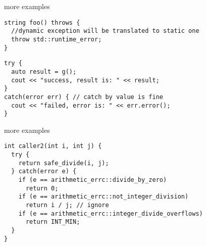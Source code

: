 \documentclass[10pt,a4paper]{beamer}
\begin{document}
\begin{frame}[fragile]{more examples}

	\begin{verbatim}
string foo() throws {
  //dynamic exception will be translated to static one
  throw std::runtime_error; 
}
	\end{verbatim}
	
	\hfill
	
	\begin{verbatim}
try {
  auto result = g();
  cout << "success, result is: " << result;
}
catch(error err) { // catch by value is fine
  cout << "failed, error is: " << err.error();
}
	\end{verbatim}
	
	
\end{frame}

\begin{frame}[fragile]{more examples}
	\begin{verbatim}
int caller2(int i, int j) {
  try {
    return safe_divide(i, j);
  } catch(error e) {
    if (e == arithmetic_errc::divide_by_zero)
      return 0;
    if (e == arithmetic_errc::not_integer_division)
      return i / j; // ignore
    if (e == arithmetic_errc::integer_divide_overflows)
      return INT_MIN;
  }
}
	\end{verbatim}
	
\end{frame}
	
\end{document}
